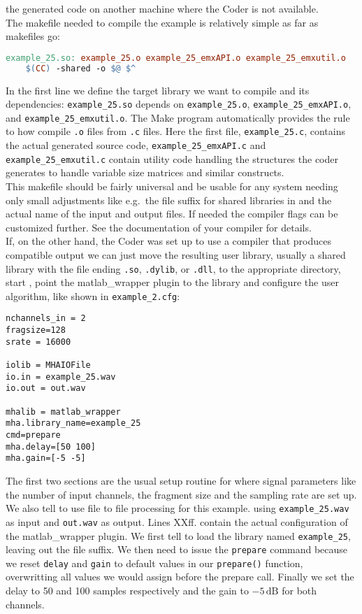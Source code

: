 \documentclass[11pt,a4paper,twoside]{article}
\newcommand{\+}{\discretionary{\mbox{\scriptsize$\hookleftarrow$}}{}{}}
\begin{document}
the generated code on another machine where the Coder is not available. \\
The makefile needed to compile the example is relatively simple as far as
makefiles go:
\begin{lstlisting}[language=make]
example_25.so: example_25.o example_25_emxAPI.o example_25_emxutil.o
    $(CC) -shared -o $@ $^
\end{lstlisting}
In the first line we define the target library we want to compile and its dependencies:
\texttt{example\_25.so} depends on \texttt{example\_25.o}, \texttt{example\_25\_emxAPI.o}, 
and \texttt{example\_25\_emxutil.o}. The Make program automatically provides the rule 
to how compile \texttt{.o} files from \texttt{.c} files.
Here the first file, \texttt{example\_25.c}, contains the actual
generated source code, \texttt{example\_25\_emxAPI.c} and
\texttt{example\_25\_emxutil.c} contain utility code handling the structures the
\Matlab{} coder generates to handle variable size matrices and similar
constructs. \\
This makefile should be fairly universal and be usable for any system needing only 
small adjustments like e.g.\ the file suffix for shared libraries in and the actual 
name of the input and output files. If needed the compiler flags can be customized further.
See the documentation of your compiler for details. \\
If, on the other hand, the \Matlab{} Coder was set up to use a compiler that produces \mha{} compatible
output we can just move the resulting user library, usually a shared library with the file ending
\texttt{.so}, \texttt{.dylib}, or \texttt{.dll}, to the appropriate directory, start \mha{},
point the matlab\_wrapper plugin to the library and configure the user
algorithm, like shown in \texttt{example\_2.cfg}:
\begin{lstlisting}
nchannels_in = 2
fragsize=128
srate = 16000

iolib = MHAIOFile
io.in = example_25.wav
io.out = out.wav

mhalib = matlab_wrapper
mha.library_name=example_25
cmd=prepare
mha.delay=[50 100]
mha.gain=[-5 -5]
\end{lstlisting}
The first two sections are the usual setup routine for \mha{} where signal
parameters like the number of input channels, the fragment size and the sampling
rate are set up. We also tell \mha{} to use file to file processing for this
example. using \texttt{example\_25.wav} as input and \texttt{out.wav} as output.
Lines XXff. contain the actual configuration of the matlab\_wrapper plugin. We
first tell \mha{} to load the library named \texttt{example\_25}, leaving out the
file suffix. We then need to issue the \texttt{prepare} command because we reset
\texttt{delay} and \texttt{gain} to default values in our \texttt{prepare()}
function, overwritting all values we would assign before the prepare call.
Finally we set the delay to 50 and 100 samples respectively and the
gain to $-5\,\mathrm{dB}$ for both channels.
\end{document}
